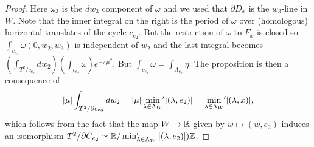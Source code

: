 \begin{proof}
Here $\omega_3$ is the $dw_3$ component of $\omega$ and we used that $\partial D_{x}$ is the $w_3$-line in $W$. Note that the inner integral on the right is the period 
of $\omega$ over (homologous) horizontal translates of the cycle $c_{e_2}$. But the restriction of $\omega$ to $F_x$ is closed so $\int_{c_{e_2}} \omega(0,w_2,w_3)$ is independent of $w_2$ and the last integral becomes
$\left(  \int_{T^2/ c_{e_2}} dw_2 \right)\left( \int_{c_{e_2}} \omega \right)e^{- \pi \mu^2}$. 
 But $\int_{c_{e_2}} \omega = \int_{A_{e_2}} \eta$. The proposition is then a consequence of
\[
|\mu| \int_{T^2/ \partial c_{e_2}} dw_2  = |\mu|  \min_{\lambda \in \Lambda_W}  {\hspace{-2pt}'} |(\lambda,e_2)| = \min_{\lambda \in \Lambda_W}  {\hspace{-2pt}'} |(\lambda,x)|,
\] 
which follows from the fact that the map $W \to \mathbb{R}$ given by $w \mapsto (w,e_2)$ induces an isomorphism $T^2/ \partial C_{e_2} \simeq \mathbb{R} / \min_{\lambda \in \Lambda_W}'|(\lambda,e_2)|)\mathbb{Z}$.  

\end{proof}
